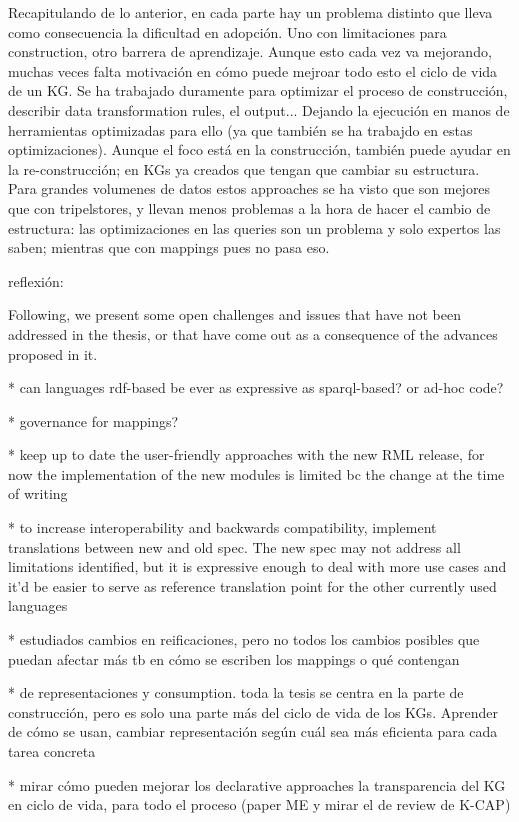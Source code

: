 Recapitulando de lo anterior, en cada parte hay un problema distinto que lleva como consecuencia la dificultad en adopción. Uno con limitaciones para construction, otro barrera de aprendizaje. Aunque esto cada vez va mejorando, muchas veces falta motivación en cómo puede mejroar todo esto el ciclo de vida de un KG. Se ha trabajado duramente para optimizar el proceso de construcción, describir data transformation rules, el output... Dejando la ejecución en manos de herramientas optimizadas para ello (ya que también se ha trabajdo en estas optimizaciones). Aunque el foco está en la construcción, también puede ayudar en la re-construcción; en KGs ya creados que tengan que cambiar su estructura. Para grandes volumenes de datos estos approaches se ha visto que son mejores que con tripelstores, y llevan menos problemas a la hora de hacer el cambio de estructura: las optimizaciones en las queries son un problema y solo expertos las saben; mientras que con mappings pues no pasa eso. 

reflexión: 


Following, we present some open challenges and issues that have not been addressed in the thesis, or that have come out as a consequence of the advances proposed in it. 

* can languages rdf-based be ever as expressive as sparql-based? or ad-hoc code?

* governance for mappings?

* keep up to date the user-friendly approaches with the new RML release, for now the implementation of the new modules is limited bc the change at the time of writing

* to increase interoperability and backwards compatibility, implement translations between new and old spec. The new spec may not address all limitations identified, but it is expressive enough to deal with more use cases and it'd be easier to serve as reference translation point for the other currently used languages

* estudiados cambios en reificaciones, pero no todos los cambios posibles que puedan afectar más tb en cómo se escriben los mappings o qué contengan

* de representaciones y consumption. toda la tesis se centra en la parte de construcción, pero es solo una parte más del ciclo de vida de los KGs. Aprender de cómo se usan, cambiar representación según cuál sea más eficienta para cada tarea concreta

* mirar cómo pueden mejorar los declarative approaches la transparencia del KG en ciclo de vida, para todo el proceso (paper ME y mirar el de review de K-CAP)

